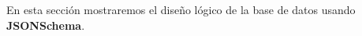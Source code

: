 En esta sección mostraremos el diseño lógico de la base de datos usando \textbf{JSONSchema}.












